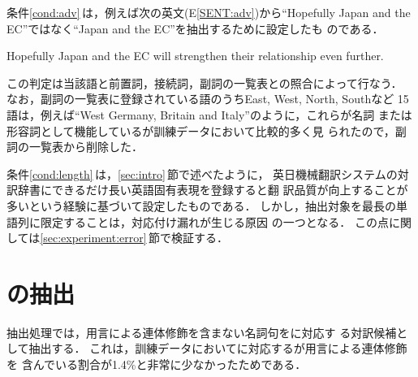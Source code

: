 条件\ref{cond:adv}\,は，例えば次の英文(E\ref{SENT:adv})から``Hopefully 
Japan and the EC''ではなく``Japan and the EC''を抽出するために設定したも
のである．
\begin{SENT}
\sentE
Hopefully Japan and the EC will strengthen their relationship even further.
\label{SENT:adv}
\end{SENT}
この判定は当該語と前置詞，接続詞，副詞の一覧表との照合によって行なう．
なお，副詞の一覧表に登録されている語のうちEast, West, North, Southなど
15語は，例えば``West Germany, Britain and Italy''のように，これらが名詞
または形容詞として機能している{\CPNP}が訓練データにおいて比較的多く見
られたので，副詞の一覧表から削除した．

条件\ref{cond:length}\,は，\ref{sec:intro}\,節で述べたように，
英日機械翻訳システムの対訳辞書にできるだけ長い英語固有表現を登録すると翻
訳品質が向上することが多いという経験に基づいて設定したものである．
しかし，抽出対象を最長の単語列に限定することは，対応付け漏れが生じる原因
の一つとなる．
この点に関しては\ref{sec:experiment:error}\,節で検証する．


\section{{\JNP}の抽出}
\label{sec:jpn_np}

{\JNP}抽出処理では，用言による連体修飾を含まない名詞句を{\CPNP}に対応す
る対訳候補として抽出する．
これは，訓練データにおいて{\CPNP}に対応する{\JNP}が用言による連体修飾を
含んでいる割合が1.4\%と非常に少なかったためである．

